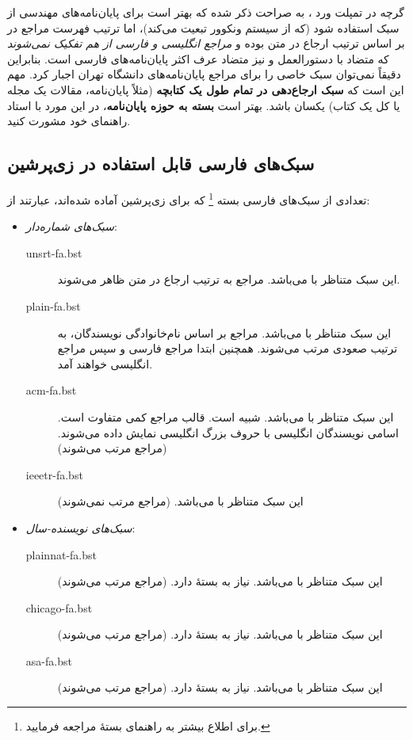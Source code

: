 گرچه در تمپلت ورد
\cite{UTThesisGuide}،
به صراحت ذکر شده که بهتر است برای پایان‌نامه‌های مهندسی از سبک
استفاده شود (که از سیستم ونکوور تبعیت می‌کند)، اما ترتیب فهرست مراجع در
بر اساس ترتیب ارجاع در متن بوده و
\emph{مراجع انگلیسی و فارسی از هم تفکیک نمی‌شوند}
که متضاد با دستورالعمل
\cite{UTThesisGuide}
و نیز متضاد عرف اکثر پایان‌نامه‌های فارسی است.
بنابراین دقیقاً نمی‌توان سبک خاصی را برای مراجع پایان‌نامه‌های دانشگاه تهران اجبار کرد. مهم این است که
\textbf{سبک ارجاع‌دهی در تمام طول یک کتابچه}
(مثلاً پایان‌نامه، مقالات یک مجله یا کل یک کتاب) یکسان باشد. بهتر است
\textbf{بسته به حوزه پایان‌نامه}،
در این مورد با استاد راهنمای خود مشورت کنید.

\subsection{سبک‌های فارسی قابل استفاده در زی‌پرشین}
تعدادی از سبک‌های فارسی بسته
%
\footnote{ برای اطلاع بیشتر به راهنمای بستهٔ
	مراجعه فرمایید.}
که برای  زی‌پرشین آماده شده‌اند، عبارتند از:

\singlespacing
\begin{itemize}
	\item \emph{سبک‌های شماره‌دار}:
	      \begin{description}
		      \item [unsrt-fa.bst] این سبک متناظر با  می‌باشد. مراجع به ترتیب ارجاع در متن ظاهر می‌شوند.
		      \item [plain-fa.bst] این سبک متناظر با  می‌باشد. مراجع بر اساس نام‌خانوادگی نویسندگان، به ترتیب صعودی مرتب می‌شوند.
		            همچنین ابتدا مراجع فارسی و سپس مراجع انگلیسی خواهند آمد.
		      \item [acm-fa.bst] این سبک متناظر با  می‌باشد. شبیه  است.  قالب مراجع کمی متفاوت است. اسامی نویسندگان انگلیسی با حروف بزرگ انگلیسی نمایش داده می‌شوند. (مراجع مرتب می‌شوند)
		      \item [ieeetr-fa.bst] این سبک متناظر با  می‌باشد. (مراجع مرتب نمی‌شوند)
	      \end{description}

	\item \emph{سبک‌های نویسنده-سال}:
	      \begin{description}
		      \item [plainnat-fa.bst] این سبک متناظر با  می‌باشد. نیاز به بستهٔ  دارد. (مراجع مرتب می‌شوند)
		      \item [chicago-fa.bst] این سبک متناظر با  می‌باشد. نیاز به بستهٔ  دارد. (مراجع مرتب می‌شوند)
		      \item [asa-fa.bst] این سبک متناظر با  می‌باشد. نیاز به بستهٔ  دارد. (مراجع مرتب می‌شوند)
	      \end{description}
\end{itemize}
\doublespacing

